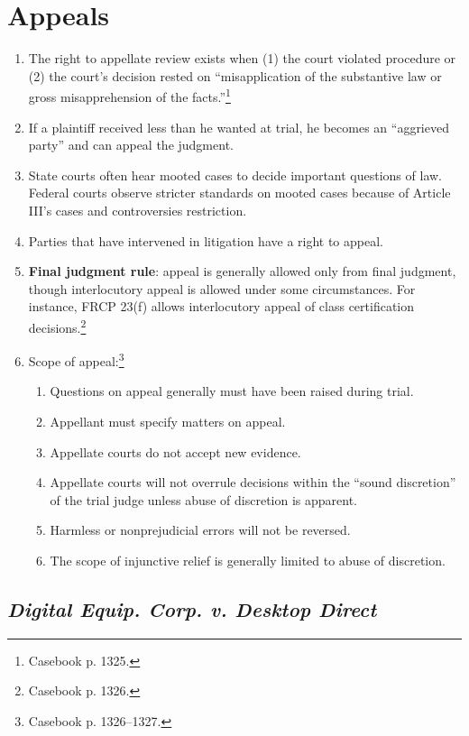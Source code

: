 \section{Appeals}

\begin{enumerate}
    \item The right to appellate review exists when (1) the court
    violated procedure or (2) the court's decision rested on ``misapplication 
    of the substantive law or gross misapprehension of the 
    facts.''\footnote{Casebook p. 1325.}
    \item If a plaintiff received less than he wanted at trial, he becomes an 
    ``aggrieved party'' and can appeal the judgment.
    \item State courts often hear mooted cases to decide important questions 
    of law. Federal courts observe stricter standards on mooted cases because 
    of Article III's cases and controversies restriction.
    \item Parties that have intervened in litigation have a right to appeal.
    \item \textbf{Final judgment rule}: appeal is generally allowed only from 
    final judgment, though interlocutory appeal is allowed under some 
    circumstances. For instance, FRCP 23(f) allows interlocutory appeal of 
    class certification decisions.\footnote{Casebook p. 1326.}
    \item Scope of appeal:\footnote{Casebook p. 1326--1327.}
    \begin{enumerate}
        \item Questions on appeal generally must have been raised during 
        trial.
        \item Appellant must specify matters on appeal.
        \item Appellate courts do not accept new evidence.
        \item Appellate courts will not overrule decisions within the ``sound 
        discretion'' of the trial judge unless abuse of discretion is 
        apparent.
        \item Harmless or nonprejudicial errors will not be reversed.
        \item The scope of injunctive relief is generally limited to abuse of 
        discretion.
    \end{enumerate}
\end{enumerate}

\subsection{\emph{Digital Equip. Corp. v. Desktop Direct}}

